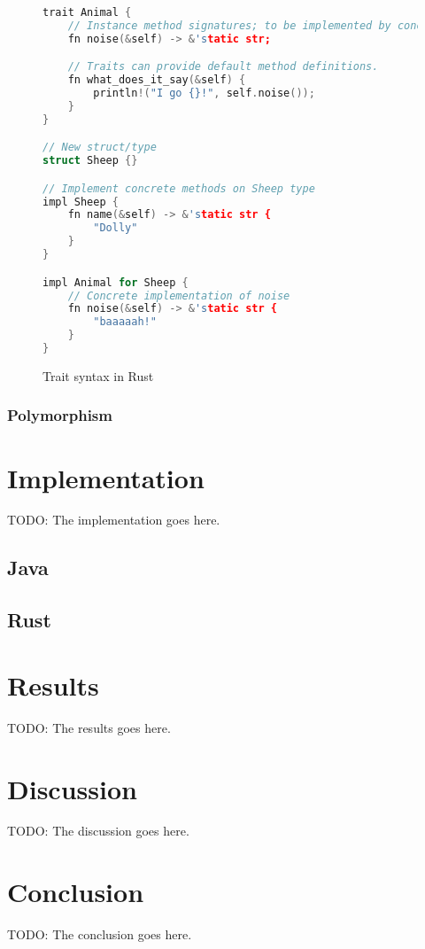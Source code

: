 \documentclass[conference]{IEEEtran}
\begin{document}
\begin{figure}[ht]
    \centering
\begin{lstlisting}[language=C++,showstringspaces=false]
trait Animal {
    // Instance method signatures; to be implemented by concrete types.
    fn noise(&self) -> &'static str;

    // Traits can provide default method definitions.
    fn what_does_it_say(&self) {
        println!("I go {}!", self.noise());
    }
}

// New struct/type
struct Sheep {}

// Implement concrete methods on Sheep type
impl Sheep {
    fn name(&self) -> &'static str {
        "Dolly"
    }
}

impl Animal for Sheep {
    // Concrete implementation of noise
    fn noise(&self) -> &'static str {
        "baaaaah!"
    }
}
\end{lstlisting}
\caption{Trait syntax in Rust}
\label{fig:trait-example}
\end{figure}

\subsubsection{Polymorphism}
\label{ssub:polymorphism}

\section{Implementation}
TODO: The implementation goes here.

\subsection{Java}
\label{sub:impl_java}

\subsection{Rust}
\label{sub:impl_rust}


\section{Results}
TODO: The results goes here.

\section{Discussion}
TODO: The discussion goes here.


\section{Conclusion}
TODO: The conclusion goes here.
\end{document}
